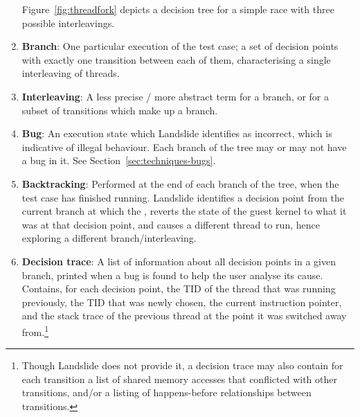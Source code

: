 \begin{enumerate}
		Figure~\ref{fig:threadfork} depicts a decision tree for a simple race with three possible interleavings.
	\item {\bf Branch}:
		One particular execution of the test case; a set of decision points with exactly one transition between each of them, characterising a single interleaving of threads.
	\item {\bf Interleaving}:
		A less precise / more abstract term for a branch, or for a subset of transitions which make up a branch.
	\item {\bf Bug}: An execution state which Landslide identifies as incorrect, which is indicative of illegal behaviour. Each branch of the tree may or may not have a bug in it. See Section~\ref{sec:techniques-bugs}.
	\item {\bf Backtracking}:
		Performed at the end of each branch of the tree, when the test case has finished running. Landslide identifies a decision point from the current branch at which the , reverts the state of the guest kernel to what it was at that decision point, and causes a different thread to run, hence exploring a different branch/interleaving.
	\item {\bf Decision trace}:
		A list of information about all decision points in a given branch, printed when a bug is found to help the user analyse its cause. Contains, for each decision point, the TID of the thread that was running previously, the TID that was newly chosen, the current instruction pointer, and the stack trace of the previous thread at the point it was switched away from.\footnote{Though Landslide does not provide it, a decision trace may also contain for each transition a list of shared memory accesses that conflicted with other transitions, and/or a listing of happens-before relationships between transitions.}
\end{enumerate}

